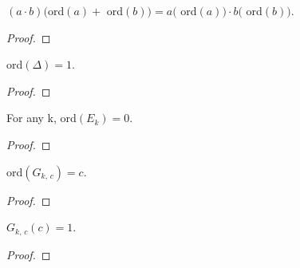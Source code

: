 \begin{theorem}
  \label{thm:coeff_mul_ord}
  \leanok
  $(a \cdot b) ($ord$(a) + $ ord$(b)) = a($ ord$(a)) \cdot b($ ord$(b))$.
\end{theorem}
\begin{proof}
  \leanok
\end{proof}


\begin{theorem}
  \label{thm:ord_Delta}
  \leanok
  ord$(\Delta) = 1$.
\end{theorem}
\begin{proof}
  \leanok
\end{proof}

\begin{theorem}
  \label{thm:ord_Eis}
  \leanok
  For any k, ord$(E_k) = 0$.
\end{theorem}
\begin{proof}
  \leanok
\end{proof}


\begin{theorem}
  \label{thm:ord_G}
  \leanok
  ord$(G_{k, \, c}) = c$.
\end{theorem}
\begin{proof}
  \leanok
\end{proof}


\begin{theorem}
  \label{thm:G_ord_G}
  \leanok
  $G_{k,\, c} (c) = 1$.
\end{theorem}
\begin{proof}
  \leanok
\end{proof}

